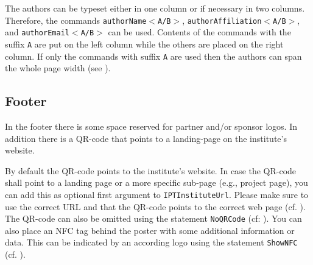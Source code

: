 The authors can be typeset either in one column or if necessary in two columns. Therefore, the commands \texttt{\bs{}authorName$<$A/B$>$}, \texttt{\bs{}authorAffiliation$<$A/B$>$}, and \texttt{\bs{}authorEmail$<$A/B$>$} can be used. Contents of the commands with the suffix \texttt{A} are put on the left column while the others are placed on the right column. If only the commands with suffix \texttt{A} are used then the authors can span the whole page width (see ).



\subsection{Footer} %
\label{subsed:footer}

In the footer there is some space reserved for partner and/or sponsor logos. In addition there is a QR-code that points to a landing-page on the institute's website.

By default the QR-code points to the institute's website. In case the QR-code shall point to a landing page or a more specific sub-page (e.g., project page), you can add this as optional first argument to \texttt{\bs{}IPTInstituteUrl}.  Please make sure to use the correct URL and that the QR-code points to the correct web page (cf. ).
The QR-code can also be omitted using the statement \texttt{\bs{}NoQRCode} (cf: ). You can also place an NFC tag behind the poster with some additional information or data. This can be indicated by an according logo using the statement \texttt{\bs{}ShowNFC} (cf. ).






